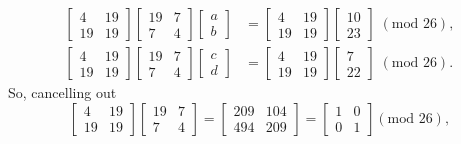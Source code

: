 \documentclass{article}
\begin{document}
\begin{align*}
    \begin{bmatrix}
        4 & 19 \\
        19 & 19
    \end{bmatrix} \begin{bmatrix}
        19 & 7 \\
        7 & 4
    \end{bmatrix} \begin{bmatrix}
        a \\
        b
    \end{bmatrix} &= \begin{bmatrix}
        4 & 19 \\
        19 & 19
    \end{bmatrix} \begin{bmatrix}
        10 \\
        23
    \end{bmatrix} \; (\text{mod } 26), \\
    \begin{bmatrix}
        4 & 19 \\
        19 & 19
    \end{bmatrix} \begin{bmatrix}
        19 & 7 \\
        7 & 4
    \end{bmatrix} \begin{bmatrix}
        c \\
        d
    \end{bmatrix} &= \begin{bmatrix}
        4 & 19 \\
        19 & 19
    \end{bmatrix} \begin{bmatrix}
        7 \\
        22
    \end{bmatrix} \; (\text{mod } 26).
\end{align*}
So, cancelling out
\[
\begin{bmatrix}
        4 & 19 \\
        19 & 19
    \end{bmatrix} \begin{bmatrix}
        19 & 7 \\
        7 & 4
    \end{bmatrix} = \begin{bmatrix}
        209 & 104 \\
        494 & 209
    \end{bmatrix} = \begin{bmatrix}
        1 & 0 \\
        0 & 1
    \end{bmatrix} (\text{mod } 26),
\]
\end{document}

